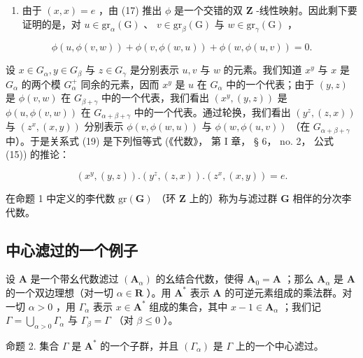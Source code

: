 \begin{enumerate}
\def\labelenumi{(\roman{enumi})}
\setcounter{enumi}{1}
\tightlist
\item
  由于 \((x, x) = e\) ，由 (17) 推出 \(\phi\) 是一个交错的双 \(\mathbf{Z}\) -线性映射。因此剩下要证明的是，对 \(u \in \mathrm{gr}_{\alpha}(\mathrm{G})\) 、 \(v \in \mathrm{gr}_{\beta}(\mathrm{G})\) 与 \(w \in \mathrm{gr}_{\gamma}(\mathrm{G})\) ，
\end{enumerate}

\[
\phi (u, \phi (v, w)) + \phi (v, \phi (w, u)) + \phi (w, \phi (u, v)) = 0.\tag{19}
\]

设 \(x \in G_{\alpha}, y \in G_{\beta}\) 与 \(z \in G_{\gamma}\) 是分别表示 \(u, v\) 与 \(w\) 的元素。我们知道 \(x^{y}\) 与 \(x\) 是 \(G_{\alpha}\) 的两个模 \(G_{\alpha}^{+}\) 同余的元素，因而 \(x^{y}\) 是 \(u\) 在 \(G_{\alpha}\) 中的一个代表；由于 \((y, z)\) 是 \(\phi(v, w)\) 在 \(G_{\beta + \gamma}\) 中的一个代表，我们看出 \((x^{y}, (y, z))\) 是 \(\phi(u, \phi(v, w))\) 在 \(G_{\alpha + \beta + \gamma}\) 中的一个代表。通过轮换，我们看出 \((y^{z}, (z, x))\) 与 \((z^{x}, (x, y))\) 分别表示 \(\phi(v, \phi(w, u))\) 与 \(\phi(w, \phi(u, v))\) （在 \(G_{\alpha + \beta + \gamma}\) 中）。于是关系式 (19) 是下列恒等式 (《代数》， 第 I 章， § 6， no. 2， 公式 (15)) 的推论：

\[
\left(x ^ {y}, (y, z)\right). \left(y ^ {z}, (z, x)\right). \left(z ^ {x}, (x, y)\right) = e.\tag{20}
\]

在命题 1 中定义的李代数 \(\mathrm{gr}(\mathbf{G})\) （环 \(\mathbf{Z}\) 上的）称为与滤过群 \(\mathbf{G}\) 相伴的分次李代数。

\subsection{中心滤过的一个例子}

设 \(\mathbf{A}\) 是一个带幺代数滤过 \((\mathbf{A}_{\alpha})\) 的幺结合代数，使得 \(\mathbf{A}_{0} = \mathbf{A}\) ；那么 \(\mathbf{A}_{\alpha}\) 是 \(\mathbf{A}\) 的一个双边理想（对一切 \(\alpha \in \mathbf{R}\) ）。用 \(\mathbf{A}^*\) 表示 \(\mathbf{A}\) 的可逆元素组成的乘法群。对一切 \(\alpha > 0\) ，用 \(\Gamma_{\alpha}\) 表示 \(x \in \mathbf{A}^*\) 组成的集合，其中 \(x - 1 \in \mathbf{A}_{\alpha}\) ；我们记 \(\Gamma = \bigcup_{\alpha > 0} \Gamma_{\alpha}\) 与 \(\Gamma_{\beta} = \Gamma\) （对 \(\beta \leqslant 0\) ）。

命题 2. 集合 \(\Gamma\) 是 \(\mathbf{A}^*\) 的一个子群，并且 \((\Gamma_{\alpha})\) 是 \(\Gamma\) 上的一个中心滤过。

